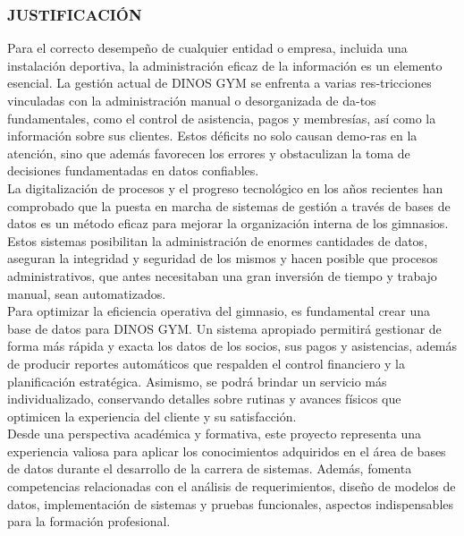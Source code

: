 \documentclass[12pt, letterpaper]{article}
\begin{document}
\subsubsection{JUSTIFICACIÓN}
Para el correcto desempeño de cualquier entidad o empresa, incluida una instalación deportiva, la administración eficaz de la información es un elemento esencial. La gestión actual de DINOS GYM se enfrenta a varias res-tricciones vinculadas con la administración manual o desorganizada de da-tos fundamentales, como el control de asistencia, pagos y membresías, así como la información sobre sus clientes. Estos déficits no solo causan demo-ras en la atención, sino que además favorecen los errores y obstaculizan la toma de decisiones fundamentadas en datos confiables.\\
La digitalización de procesos y el progreso tecnológico en los años recientes han comprobado que la puesta en marcha de sistemas de gestión a través de bases de datos es un método eficaz para mejorar la organización interna de los gimnasios. Estos sistemas posibilitan la administración de enormes cantidades de datos, aseguran la integridad y seguridad de los mismos y hacen posible que procesos administrativos, que antes necesitaban una gran inversión de tiempo y trabajo manual, sean automatizados.\\
Para optimizar la eficiencia operativa del gimnasio, es fundamental crear una base de datos para DINOS GYM. Un sistema apropiado permitirá gestionar de forma más rápida y exacta los datos de los socios, sus pagos y asistencias, además de producir reportes automáticos que respalden el control financiero y la planificación estratégica. Asimismo, se podrá brindar un servicio más individualizado, conservando detalles sobre rutinas y avances físicos que optimicen la experiencia del cliente y su satisfacción.\\
Desde una perspectiva académica y formativa, este proyecto representa una experiencia valiosa para aplicar los conocimientos adquiridos en el área de bases de datos durante el desarrollo de la carrera de sistemas. Además, fomenta competencias relacionadas con el análisis de requerimientos, diseño de modelos de datos, implementación de sistemas y pruebas funcionales, aspectos indispensables para la formación profesional.
\end{document}
